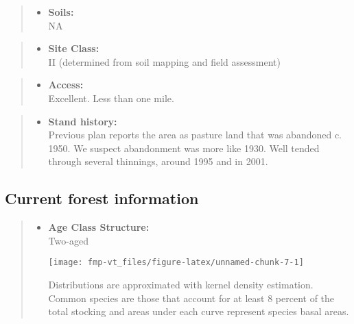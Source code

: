 \documentclass[]{tufte-handout}
\providecommand{\tightlist}{%
  \setlength{\itemsep}{0pt}\setlength{\parskip}{0pt}}
\begin{document}
\begin{quote}
\begin{itemize}
\tightlist
\item
  \textbf{Soils:}\\
  \indent\indent  NA
\end{itemize}
\end{quote}

\begin{quote}
\begin{itemize}
\tightlist
\item
  \textbf{Site Class:}\\
  \vspace{2pt} II (determined from soil mapping and field assessment)
\end{itemize}
\end{quote}

\begin{quote}
\begin{itemize}
\tightlist
\item
  \textbf{Access:}\\
  \vspace{2pt} Excellent. Less than one mile.
\end{itemize}
\end{quote}

\begin{quote}
\begin{itemize}
\tightlist
\item
  \textbf{Stand history:}\\
  \vspace{2pt} Previous plan reports the area as pasture land that was
  abandoned c. 1950. We suspect abandonment was more like 1930. Well
  tended through several thinnings, around 1995 and in 2001.
\end{itemize}
\end{quote}

\subsection{Current forest
information}\label{current-forest-information-1}

\begin{quote}
\begin{itemize}
\tightlist
\item
  \textbf{Age Class Structure:}\\
  \vspace{2pt} Two-aged\\

  \begin{marginfigure}
  \texttt{[image: fmp-vt\_files/figure-latex/unnamed-chunk-7-1]} \caption[Distributions are approximated with kernel density estimation]{Distributions are approximated with kernel density estimation. Common species are those that account for at least 8 percent of the total stocking and areas under each curve represent species basal areas.}\label{fig:unnamed-chunk-7}
  \end{marginfigure}
\end{itemize}
\end{quote}
\end{document}
